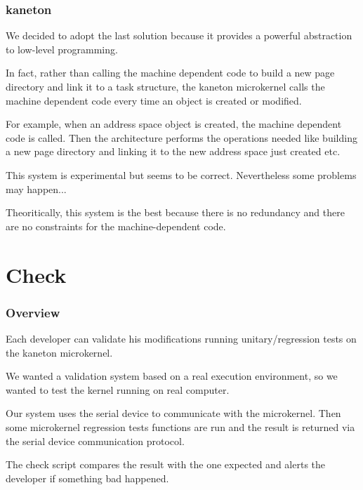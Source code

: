 \begin{frame}
  \frametitle{kaneton}

  We decided to adopt the last solution because it provides a powerful
  abstraction to low-level programming.

  \-

  In fact, rather than calling the machine dependent code to build
  a new page directory and link it to a task structure, the kaneton
  microkernel calls the machine dependent code every time an
  object is created or modified.

  \-

  For example, when an address space object is created, the machine
  dependent code is called. Then the architecture performs the operations
  needed like building a new page directory and linking it to the
  new address space just created etc.

  \-

  This system is experimental but seems to be correct. Nevertheless some
  problems may happen...

  \-

  Theoritically, this system is the best because there is no redundancy
  and there are no constraints for the machine-dependent code.
\end{frame}

%
%

\section{Check}


\begin{frame}
  \frametitle{Overview}

  Each  developer can validate his modifications running unitary/regression
  tests on the kaneton microkernel.

  \-

  We wanted a validation system based on a real execution environment,
  so we wanted to test the kernel running on real computer.

  \-

  Our system uses the serial device to communicate with the microkernel. Then
  some microkernel regression tests functions are run and the result
  is returned via the serial device communication protocol.

  \-

  The check script compares the result with the one expected and alerts
  the developer if something bad happened.
\end{frame}

